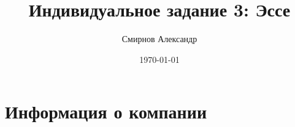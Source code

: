 \documentclass[a4paper,8pt]{article}
\title{Индивидуальное задание 3: Эссе}
\author{ Смирнов Александр }
\date{\today}
\begin{document}
\maketitle


\section{Информация о компании}
\end{document}
